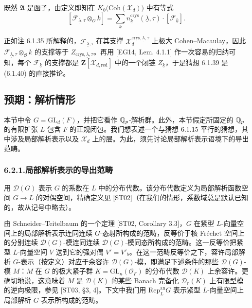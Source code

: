 既然 $\mathfrak A$ 是函子，由定义即知在 $K_0\bigl(\mathrm{Coh}(\mathcal X_d)\bigr)$ 中有等式
\begin{equation}\tag{6.1.40}\label{eq:a4-6-1-40}
[\mathcal F_{\underline\lambda,\tau}\otimes_{\mathcal O}k]
=\sum_{\underline k}n^{\mathrm{crys}}_{\underline k}(\underline\lambda,\tau)\cdot[\mathcal F_{\underline k}].
\end{equation}

正如注 6.1.35 所解释的，$\mathcal F_{\underline\lambda,\tau}$ 在其支撑 $\mathcal X_d^{\mathrm{crys},\underline\lambda,\tau}$ 上极大 Cohen--Macaulay，因此 $\mathcal F_{\underline\lambda,\tau}\otimes_{\mathcal O}k$ 的支撑等于 $Z_{\mathrm{crys},\underline\lambda,\tau}$。再用 [EG14, Lem. 4.1.1] 作一次容易的归纳可知，每个 $\mathcal F_{\underline k}$ 的支撑都是 $\mathbf Z[\mathcal X_{d,\mathrm{red}}]$ 中的一个闭链 $Z_{\underline k}$，于是猜想 6.1.39 是 (6.1.40) 的直接推论。

\subsection{预期：解析情形}

本节中令 $G=\mathrm{GL}_d(F)$，并把它看作 $\mathbb{Q}_p$-解析群。此外，本节假定所固定的 $\mathbb{Q}_p$ 的有限扩张 $L$ 包含 $F$ 的正规闭包。我们想表述一个与猜想 6.1.15 平行的猜想，其中涉及局部解析表示以及 $\mathcal X_d$ 上的层。为此，须先讨论局部解析表示语境下的导出范畴。

\subsubsection*{6.2.1.\quad 局部解析表示的导出范畴}

用 $\mathcal D(G)$ 表示 $G$ 的系数在 $L$ 中的分布代数。该分布代数定义为局部解析函数空间 $G\to L$ 的对偶空间，精确定义见 [ST02]（在我们的情形，系数域总是默认已知的，故从记号中略去）。

由 Schneider--Teitelbaum 的一个定理 [ST02, Corollary 3.3]，$G$ 在紧型 $L$-向量空间上的局部解析表示连同连续 $G$-态射所构成的范畴，反等价于核 Fréchet 空间上的分别连续 $\mathcal D(G)$-模连同连续 $\mathcal D(G)$-模同态所构成的范畴。这一反等价把紧型 $L$-向量空间 $V$ 送到它的强对偶 $V'=V'_b$。在这一范畴反等价之下，容许局部解析 $G$-表示（按定义）对应于余容许 $\mathcal D(G)$-模，即满足下述条件的那些 $\mathcal D(G)$-模 $M$：$M$ 在 $G$ 的极大紧子群 $K=\mathrm{GL}_n(\mathcal O_F)$ 的分布代数 $\mathcal D(K)$ 上余容许。更确切地说，这意味着 $M$ 是 $\mathcal D(K)$ 的某些 Banach 完备化 $\mathcal D_r(K)$ 上有限型模的逆向极限，参见 [ST03, §3, 4]。下文中我们用 $\mathrm{Rep}^{\mathrm{an}}_L G$ 表示紧型 $L$-向量空间上局部解析 $G$-表示所构成的范畴。


